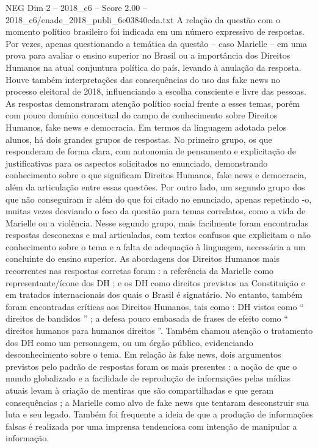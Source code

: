 \begin{textsample}{NEG Dim 2 – 2018\_c6 – Score 2.00 – 2018\_c6/enade\_2018\_publi\_6e03840cda.txt}
A relação da questão com o momento político brasileiro foi indicada em um número expressivo de respostas.
Por vezes, apenas questionando a temática da questão – caso Marielle – em uma prova para avaliar o ensino superior no Brasil ou a importância dos Direitos Humanos na atual conjuntura política do país, levando à anulação da resposta.
Houve também interpretações das consequências do uso das fake news no processo eleitoral de 2018, influenciando a escolha consciente e livre das pessoas.
As respostas demonstraram atenção político social frente a esses temas, porém com pouco domínio conceitual do campo de conhecimento sobre Direitos Humanos, fake news e democracia.
Em termos da linguagem adotada pelos alunos, há dois grandes grupos de respostas.
No primeiro grupo, os que responderam de forma clara, com autonomia de pensamento e explicitação de justificativas para os aspectos solicitados no enunciado, demonstrando conhecimento sobre o que significam Direitos Humanos, fake news e democracia, além da articulação entre essas questões.
Por outro lado, um segundo grupo dos que não conseguiram ir além do que foi citado no enunciado, apenas repetindo -o, muitas vezes desviando o foco da questão para temas correlatos, como a vida de Marielle ou a violência.
Nesse segundo grupo, mais facilmente foram encontradas respostas desconexas e mal articuladas, com textos confusos que explicitam o não conhecimento sobre o tema e a falta de adequação à linguagem, necessária a um concluinte do ensino superior.
As abordagens dos Direitos Humanos mais recorrentes nas respostas corretas foram : a referência da Marielle como representante/ícone dos DH ; e os DH como direitos previstos na Constituição e em tratados internacionais dos quais o Brasil é signatário.
No entanto, também foram encontradas críticas aos Direitos Humanos, tais como : DH vistos como “ direitos de bandidos ” ; a defesa pouco embasada de frases de efeito como “ direitos humanos para humanos direitos ”.
Também chamou atenção o tratamento dos DH como um personagem, ou um órgão público, evidenciando desconhecimento sobre o tema.
Em relação às fake news, dois argumentos previstos pelo padrão de respostas foram os mais presentes : a noção de que o mundo globalizado e a facilidade de reprodução de informações pelas mídias atuais levam à criação de mentiras que são compartilhadas e que geram consequências ; a Marielle como alvo de fake news que tentaram desconstruir sua luta e seu legado.
Também foi frequente a ideia de que a produção de informações falsas é realizada por uma imprensa tendenciosa com intenção de manipular a informação.

\end{textsample}
